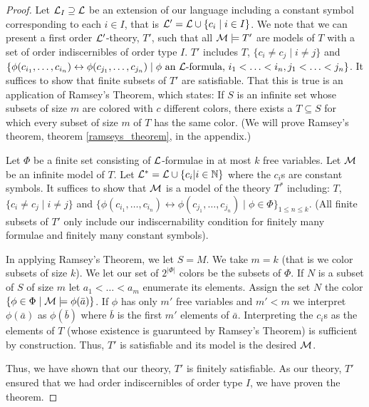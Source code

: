 \begin{proof}
Let \(\mathcal{L}_I \supseteq \mathcal{L}\) be an extension of our language including a constant symbol corresponding to each \(i \in I\), that is \(\mathcal{L}' = \mathcal{L} \cup \{c_i \mid i \in I\}\).
We note that we can present a first order \(\mathcal{L}'\)-theory, \(T'\), such that all \(\mathcal{M} \models T'\) are models of \(T\) with a set of order indiscernibles of order type \(I\).
\(T'\) includes \(T\), \(\{c_i \neq c_j \mid i \neq j\}\) and \(\{\phi(c_{i_1}, \ldots, c_{i_n}) \leftrightarrow \phi(c_{j_1}, \ldots, c_{j_n}) \mid \phi \text{ an } \mathcal{L} \text{-formula, } i_1 < \ldots < i_n, j_1 < \ldots < j_n\}\). 
It suffices to show that finite subsets of \(T'\) are satisfiable. 
That this is true is an application of Ramsey's Theorem, which states: 
If \(S\) is an infinite set whose subsets of size \(m\) are colored with \(c\) different colors, there exists a \(T \subseteq S\) for which every subset of size \(m\) of \(T\) has the same color. 
(We will prove Ramsey's theorem, theorem \ref{ramseys_theorem}, in the appendix.)

Let \(\Phi\) be a finite set consisting of \(\mathcal{L}\)-formulae in at most \(k\) free variables. 
Let \(\mathcal{M}\) be an infinite model of \(T\). 
Let \(\mathcal{L}^* = \mathcal{L} \cup \{c_i | i \in \mathbb{N}\}\) where the \(c_i\)s are constant symbols.
It suffices to show that \(\mathcal{M}\) is a model of the theory \(T^*\) including: \(T\), \(\{c_i \neq c_j \mid i \neq j\}\) and \(\{\phi(c_{i_1}, \ldots, c_{i_n}) \leftrightarrow \phi(c_{j_1}, \ldots, c_{j_n}) \mid \phi \in \Phi\}_{1 \leq n \leq k}\). 
(All finite subsets of \(T'\) only include our indiscernability condition for finitely many formulae and finitely many constant symbols).

In applying Ramsey's Theorem, we let \(S = M\). 
We take \(m = k\) (that is we color subsets of size \(k\)).
We let our set of \(2^{|\Phi|}\) colors be the subsets of \(\Phi\). 
If \(N\) is a subset of \(S\) of size \(m\) let \(a_1 < \ldots < a_m\) enumerate its elements. 
Assign the set \(N\) the color \(\{\phi \in \Phi \mid \mathcal{M} \models \phi(\bar{a})\}\). 
If \(\phi\) has only \(m'\) free variables and \(m' < m\) we interpret \(\phi(\bar{a})\) as \(\phi(\bar{b})\) where \(\bar{b}\) is the first \(m'\) elements of \(\bar{a}\).
Interpreting the \(c_i\)s as the elements of \(T\) (whose existence is guarunteed by Ramsey's Theorem) is sufficient by construction. Thus, \(T'\) is satisfiable and its model is the desired \(\mathcal{M}\).

Thus, we have shown that our theory, \(T'\) is finitely satisfiable.
As our theory, \(T'\) ensured that we had order indiscernibles of order type \(I\), we have proven the theorem.
\end{proof}

